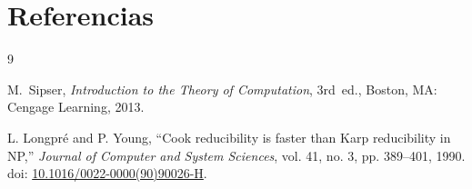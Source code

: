 \section{Referencias}

\begin{thebibliography}{9}

M.~Sipser, \emph{Introduction to the Theory of Computation},
3rd~ed., Boston, MA: Cengage Learning, 2013.

L. Longpré and P. Young,
``Cook reducibility is faster than Karp reducibility in NP,''
\textit{Journal of Computer and System Sciences},
vol. 41, no. 3, pp. 389--401, 1990.
doi: \href{https://doi.org/10.1016/0022-0000(90)90026-H}{10.1016/0022-0000(90)90026-H}.


\end{thebibliography}



